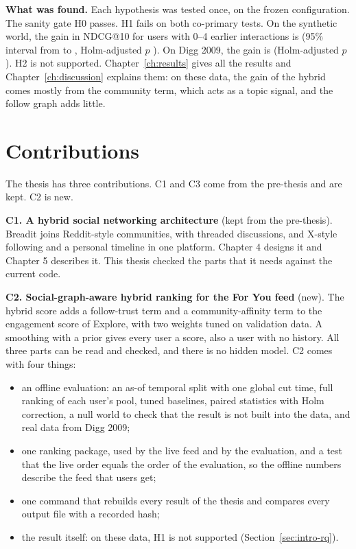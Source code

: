 \textbf{What was found.} Each hypothesis was tested once, on the frozen configuration. The sanity gate H0 passes. H1 fails on both co-primary tests. On the synthetic world, the gain in NDCG@10 for users with 0--4 earlier interactions is \eTwoWTwoMNdcgTenZeroFourGain{} (95\% interval from \eTwoWTwoMNdcgTenZeroFourCiLow{} to \eTwoWTwoMNdcgTenZeroFourCiHigh{}, Holm-adjusted $p$ \eTwoWTwoMNdcgTenZeroFourPHolm{}). On Digg 2009, the gain is \eTwoDiggNdcgTenZeroFourGainFull{} (Holm-adjusted $p$ \eTwoDiggNdcgTenZeroFourPHolm{}). H2 is not supported. Chapter~\ref{ch:results} gives all the results and Chapter~\ref{ch:discussion} explains them: on these data, the gain of the hybrid comes mostly from the community term, which acts as a topic signal, and the follow graph adds little.

\section{Contributions}
\label{sec:intro-contrib}

The thesis has three contributions. C1 and C3 come from the pre-thesis and are kept. C2 is new.

\textbf{C1. A hybrid social networking architecture} (kept from the pre-thesis). Breadit joins Reddit-style communities, with threaded discussions, and X-style following and a personal timeline in one platform. Chapter 4 designs it and Chapter 5 describes it. This thesis checked the parts that it needs against the current code.

\textbf{C2. Social-graph-aware hybrid ranking for the For You feed} (new). The hybrid score adds a follow-trust term and a community-affinity term to the engagement score of Explore, with two weights tuned on validation data. A smoothing with a prior gives every user a score, also a user with no history. All three parts can be read and checked, and there is no hidden model. C2 comes with four things:
\begin{itemize}
  \item an offline evaluation: an as-of temporal split with one global cut time, full ranking of each user's pool, tuned baselines, paired statistics with Holm correction, a null world to check that the result is not built into the data, and real data from Digg 2009;
  \item one ranking package, used by the live feed and by the evaluation, and a test that the live order equals the order of the evaluation, so the offline numbers describe the feed that users get;
  \item one command that rebuilds every result of the thesis and compares every output file with a recorded hash;
  \item the result itself: on these data, H1 is not supported (Section~\ref{sec:intro-rq}).
\end{itemize}

